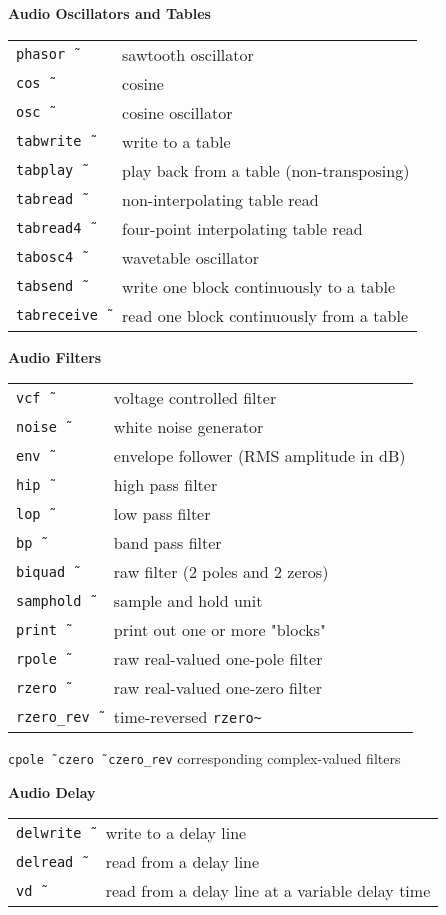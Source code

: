 \documentclass[a4paper, landscape, 10pt]{article}
\newcommand{\refcardtitle}[1]{
  \begin{center}
    \textbf{\small{#1}}
  \end{center}
}
\begin{document}
\begin{multicols}{3}
  \columnbreak
  \refcardtitle{Audio Oscillators and Tables}
  \begin{tabularx}{9cm}{>{\tt}l X}
    phasor\~\ & sawtooth oscillator \\
    cos\~\ & cosine \\
    osc\~\ & cosine oscillator \\
    tabwrite\~\ & write to a table \\
    tabplay\~\ & play back from a table (non-transposing) \\
    tabread\~\ & non-interpolating table read \\
    tabread4\~\ & four-point interpolating table read \\
    tabosc4\~\ & wavetable oscillator \\ 
    tabsend\~\ & write one block continuously to a table \\
    tabreceive\~\ & read one block continuously from a table \\
  \end{tabularx}

  \refcardtitle{Audio Filters}
  \begin{tabularx}{9cm}{>{\tt}l X}
    vcf\~\ & voltage controlled filter \\
    noise\~\ &  white noise generator \\
    env\~\ & envelope follower (RMS amplitude in dB) \\
    hip\~\ &  high pass filter \\
    lop\~\ &  low pass filter \\ 
    bp\~\ &  band pass filter \\
    biquad\~\ & raw filter (2 poles and 2 zeros)\\ 
    samphold\~\ & sample and hold unit \\
    print\~\ & print out one or more "blocks" \\
    rpole\~\ & raw real-valued one-pole filter \\
    rzero\~\ & raw real-valued one-zero filter \\
    rzero\_rev\~\ & time-reversed \texttt{rzero\~} \\
  \end{tabularx}
  \texttt{cpole\~\, czero\~\, czero\_rev} corresponding complex-valued filters

  \refcardtitle{Audio Delay}
  \begin{tabularx}{9cm}{>{\tt}l X}
    delwrite\~\ & write to a delay line \\
    delread\~\ & read from a delay line \\
    vd\~\ & read from a delay line at a variable delay time \\
  \end{tabularx}


\end{multicols}
\end{document}
